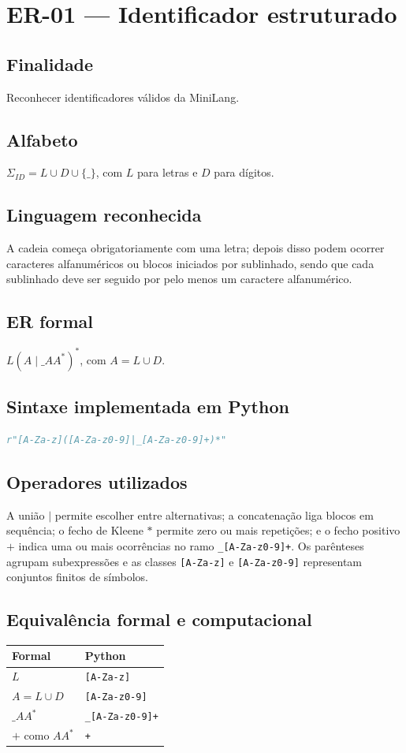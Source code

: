 \section{ER-01 --- Identificador estruturado}
\subsection{Finalidade}
Reconhecer identificadores válidos da MiniLang.
\subsection{Alfabeto}
$\Sigma_{ID}=L\cup D\cup\{\_\}$, com $L$ para letras e $D$ para dígitos.
\subsection{Linguagem reconhecida}
A cadeia começa obrigatoriamente com uma letra; depois disso podem ocorrer caracteres alfanuméricos ou blocos iniciados por sublinhado, sendo que cada sublinhado deve ser seguido por pelo menos um caractere alfanumérico.
\subsection{ER formal}
$L(A\mid\_AA^*)^*$, com $A=L\cup D$.
\subsection{Sintaxe implementada em Python}
\begin{lstlisting}[language=Python]
r"[A-Za-z]([A-Za-z0-9]|_[A-Za-z0-9]+)*"
\end{lstlisting}
\subsection{Operadores utilizados}
A união $\mid$ permite escolher entre alternativas; a concatenação liga blocos em sequência; o fecho de Kleene $*$ permite zero ou mais repetições; e o fecho positivo $+$ indica uma ou mais ocorrências no ramo \texttt{\_[A-Za-z0-9]+}. Os parênteses agrupam subexpressões e as classes \texttt{[A-Za-z]} e \texttt{[A-Za-z0-9]} representam conjuntos finitos de símbolos.
\subsection{Equivalência formal e computacional}
\begin{center}
\small
\begin{tabular}{|p{}|p{}|}
\toprule
Formal & Python \\
\midrule
$L$ & \texttt{[A-Za-z]} \\
$A=L\cup D$ & \texttt{[A-Za-z0-9]} \\
$\_AA^*$ & \texttt{\_[A-Za-z0-9]+} \\
$+$ como $AA^*$ & \texttt{+} \\
\bottomrule
\end{tabular}
\end{center}
